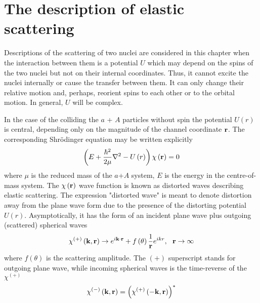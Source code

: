 \documentclass[
11pt, %
english, %
onehalfspacing, %
headsepline, %
]{MastersDoctoralThesis} %
\begin{document}
\label{Chapter1} %


\section{The description of elastic scattering}
Descriptions of the scattering of two nuclei are considered in this chapter when the interaction between them is a potential $U$ which may depend on the spins of the two nuclei but not on their internal coordinates. Thus, it cannot excite the nuclei internally or cause the transfer between them. It can only change their relative motion and, perhaps, reorient spins to each other or to the orbital motion. In general, $U$ will be complex. 

In the case of the colliding the  $a$ + $A$  particles without spin the potential $U\left( r \right)$ is central, depending only on the magnitude of the channel coordinate ${\bf r}$.
The corresponding Shr\"{o}dinger equation may be written explicitly
\begin{equation}
\left( E + \frac{\hbar^2}{2 \mu} {\bf \nabla}^2 - U \left( r \right) \right) 
\chi \left( {\bf r} \right) =0 
\label{es_she1}
\end{equation}
where $\mu$ is the reduced mass of the $a$+$A$ system, $E$ is the energy in the centre-of-mass system.
The $\chi \left( {\bf r} \right)$ wave function is known as distorted waves describing elastic scattering. The expression "distorted wave" is meant to denote distortion away from the plane wave form due to the presence   of the distorting potential $U \left( r \right)$. Asymptotically, it has the form of an incident plane wave plus outgoing (scattered) spherical waves
\begin{equation}
\chi^{(+)} \left( {\bf k}, {\bf r} \right) \rightarrow
e^{i {\bf k} \cdot {\bf r}} + f \left( \theta \right) \frac{1}{{\bf r}}
e^{i k r}, ~~  {\bf r} \rightarrow \infty
\label{es_chi_assymp_with_f}
\end{equation}
where $f \left( \theta \right)$ is the scattering amplitude. The $(+)$ superscript stands for outgoing plane wave, while incoming spherical waves is the time-reverse of the $\chi^{(+)}$
\begin{equation}
\chi^{(-)} \left( {\bf k}, {\bf r} \right) = 
\left( \chi^{(+)} \left(- {\bf k}, {\bf r} \right) \right)^{*}
\end{equation}
\end{document}
